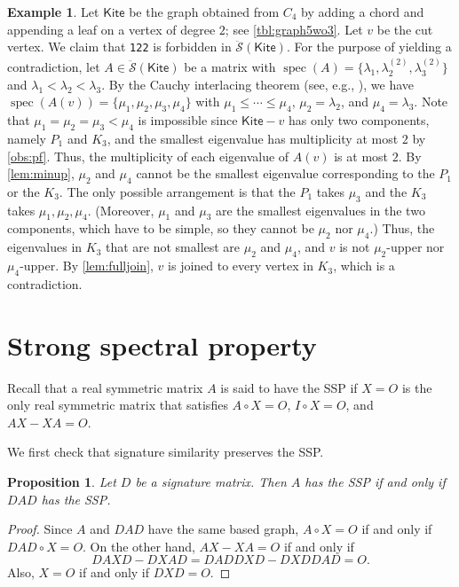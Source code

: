 \documentclass{article}
\newtheorem{proposition}[theorem]{Proposition}
\theoremstyle{definition}
\newtheorem{example}[theorem]{Example}
\newcommand{\spec}{\operatorname{spec}}
\newcommand{\mdso}{\ddot{\mathcal{S}}}
\newcommand{\Kite}{\mathsf{Kite}}
\newcommand{\mtt}[2][]{\texttt{#2}\textsubscript{#1}}
\begin{document}
\begin{example}
\label{ex:kitej}
Let $\Kite$ be the graph obtained from $C_4$ by adding a chord and appending a leaf on a vertex of degree $2$; see \cref{tbl:graph5wo3}.  Let $v$ be the cut vertex.  We claim that \mtt{122} is forbidden in $\mdso(\Kite)$.  For the purpose of yielding a contradiction, let $A\in\mdso(\Kite)$ be a matrix with $\spec(A) = \{\lambda_1, \lambda_2^{(2)}, \lambda_3^{(2)}\}$ and $\lambda_1 < \lambda_2 < \lambda_3$.  By the Cauchy interlacing theorem (see, e.g., \cite{BHSoG12}), we have $\spec(A(v)) = \{\mu_1, \mu_2, \mu_3, \mu_4\}$ with $\mu_1 \leq \cdots \leq \mu_4$, $\mu_2 = \lambda_2$, and $\mu_4 = \lambda_3$.  Note that $\mu_1 = \mu_2 = \mu_3 < \mu_4$ is impossible since $\Kite - v$ has only two components, namely $P_1$ and $K_3$, and the smallest eigenvalue has multiplicity at most $2$ by \cref{obs:pf}.  Thus, the multiplicity of each eigenvalue of $A(v)$ is at most $2$.  By \cref{lem:minup}, $\mu_2$ and $\mu_4$ cannot be the smallest eigenvalue corresponding to the $P_1$ or the $K_3$.  The only possible arrangement is that the $P_1$ takes $\mu_3$ and the $K_3$ takes $\mu_1, \mu_2, \mu_4$.  (Moreover, $\mu_1$ and $\mu_3$ are the smallest eigenvalues in the two components, which have to be simple, so they cannot be $\mu_2$ nor $\mu_4$.)  Thus, the eigenvalues in $K_3$ that are not smallest are $\mu_2$ and $\mu_4$, and $v$ is not $\mu_2$-upper nor $\mu_4$-upper.  By \cref{lem:fulljoin}, $v$ is joined to every vertex in $K_3$, which is a contradiction.
\end{example}


\section{Strong spectral property}
\label{sec:SSP}

Recall that a real symmetric matrix $A$ is said to have the SSP if $X = O$ is the only real symmetric matrix that satisfies $A\circ X = O$, $I\circ X = O$, and $AX - XA = O$.

We first check that signature similarity preserves the SSP.

\begin{proposition}
Let $D$ be a signature matrix.  Then $A$ has the SSP if and only if $DAD$ has the SSP.
\end{proposition}
\begin{proof}
Since $A$ and $DAD$ have the same based graph, $A \circ X = O$ if and only if $DAD \circ X = O$.  On the other hand, $AX - XA = O$ if and only if 
\[
    DAXD - DXAD = DADDXD - DXDDAD = O.
\]
Also, $X = O$ if and only if $DXD = O$.  
\end{proof}
\end{document}
